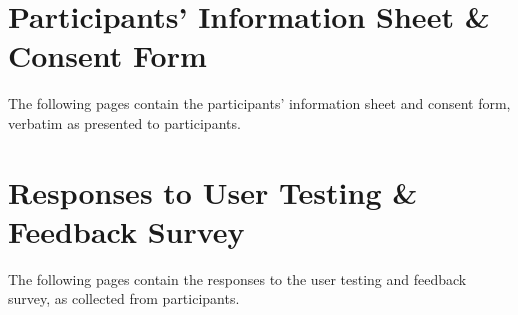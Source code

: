 \documentclass[../main.tex]{subfiles}
\begin{document}
\appendix
    \chapter{Participants' Information Sheet \& Consent Form}
        The following pages contain the participants' information sheet and consent
            form, verbatim as presented to participants.

        \begin{center}
            
        \end{center}

    \chapter{Responses to User Testing \& Feedback Survey}
        The following pages contain the responses to the user testing and feedback
            survey, as collected from participants.
\end{document}
